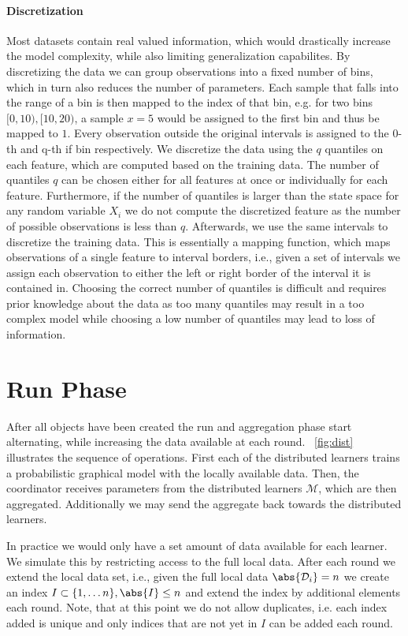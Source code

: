 \paragraph*{Discretization}
Most datasets contain real valued information, which would drastically increase the model complexity, while also limiting generalization capabilites.
By discretizing the data we can group observations into a fixed number of bins, which in turn also reduces the number of parameters.
Each sample that falls into the range of a bin is then mapped to the index of that bin, e.g. for two bins $[0,10),[10,20)$, a sample $x=5$ would be assigned to the first bin and thus be mapped to $1$.
Every observation outside the original intervals is assigned to the 0-th and q-th if bin respectively.
We discretize the data using the $q$ quantiles on each feature, which are computed based on the training data. 
The number of quantiles $q$ can be chosen either for all features at once or individually for each feature.
Furthermore, if the number of quantiles is larger than the state space for any random variable $X_i$ we do not compute the discretized feature as the number of possible observations is less than $q$.
Afterwards, we use the same intervals to discretize the training data.
This is essentially a mapping function, which maps observations of a single feature to interval borders, i.e., given a set of intervals we assign each observation to either the left or right border of the interval it is contained in.
Choosing the correct number of quantiles is difficult and requires prior knowledge about the data as too many quantiles may result in a too complex model while choosing a low number of quantiles may lead to loss of information.

\section{Run Phase}
After all objects have been created the run and aggregation phase start alternating, while increasing the data available at each round.
\fig~\ref{fig:dist} illustrates the sequence of operations.
First each of the distributed learners trains a probabilistic graphical model with the locally available data.  
Then, the coordinator receives parameters from the distributed learners $\mathcal{M}$, which are then aggregated. 
Additionally we may send the aggregate back towards the distributed learners.

In practice we would only have a set amount of data available for each learner.
We simulate this by restricting access to the full local data.
After each round we extend the local data set, i.e., given the full local data $\abs{\mathcal{D}_i} = n$  we create an index $I\subset \{1, \ldots n\}, \abs{I} \leq n$ and extend the index by additional elements each round. 
Note, that at this point we do not allow duplicates, i.e. each index added is unique and only indices that are not yet in $I$ can be added each round.

